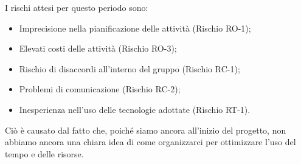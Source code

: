 I rischi attesi per questo periodo sono:
\begin{itemize}
	\item Imprecisione nella pianificazione delle attività (Rischio RO-1);
	\item Elevati costi delle attività (Rischio RO-3);
	\item Rischio di disaccordi all'interno del gruppo (Rischio RC-1);
	\item Problemi di comunicazione (Rischio RC-2);
	\item Inesperienza nell'uso delle tecnologie adottate (Rischio RT-1).
\end{itemize}
Ciò è causato dal fatto che, poiché siamo ancora all'inizio del progetto, non abbiamo ancora una chiara idea di come organizzarci per ottimizzare l'uso del tempo e delle risorse.

